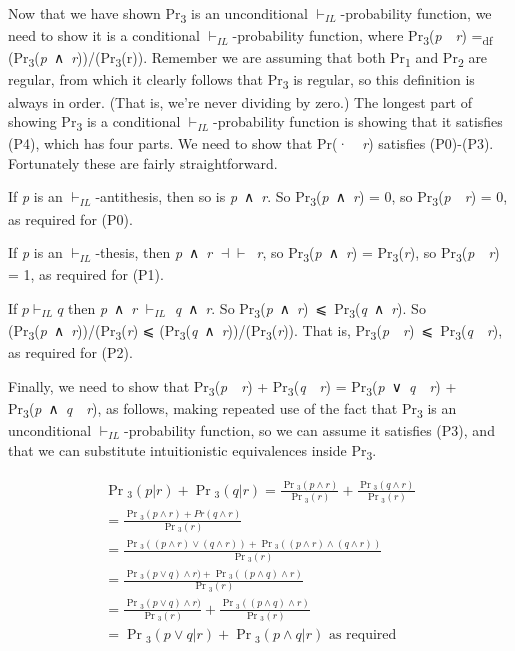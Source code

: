 \documentclass[
  10pt,
  letterpaper,
  DIV=11,
  numbers=noendperiod,
  twoside]{scrartcl}
\begin{document}
Now that we have shown Pr\textsubscript{3} is an unconditional
\(\vdash_{IL}\)-probability function, we need to show it is a
conditional \(\vdash_{IL}\)-probability function, where
Pr\textsubscript{3}(\emph{p}~\textbar~\emph{r}) =\textsubscript{df}
(Pr\textsubscript{3}(\emph{p}~∧~\emph{r}))/(Pr\textsubscript{3}(r)).
Remember we are assuming that both Pr\textsubscript{1} and
Pr\textsubscript{2} are regular, from which it clearly follows that
Pr\textsubscript{3} is regular, so this definition is always in order.
(That is, we're never dividing by zero.) The longest part of showing
Pr\textsubscript{3} is a conditional \(\vdash_{IL}\)-probability
function is showing that it satisfies (P4), which has four parts. We
need to show that Pr(·~\textbar~\emph{r}) satisfies (P0)-(P3).
Fortunately these are fairly straightforward.

If \emph{p} is an \(\vdash_{IL}\)-antithesis, then so is
\emph{p}~∧~\emph{r}. So Pr\textsubscript{3}(\emph{p}~∧~\emph{r}) = 0, so
Pr\textsubscript{3}(\emph{p}~\textbar~\emph{r}) = 0, as required for
(P0).

If \emph{p} is an \(\vdash_{IL}\)-thesis, then \emph{p}~∧~\emph{r}
\(\dashv \vdash\)~\emph{r}, so Pr\textsubscript{3}(\emph{p}~∧~\emph{r})
= Pr\textsubscript{3}(\emph{r}), so
Pr\textsubscript{3}(\emph{p}~\textbar~\emph{r}) = 1, as required for
(P1).

If \(p \vdash_{IL} q\) then \emph{p}~∧~\emph{r} \(\vdash_{IL}\)
\emph{q}~∧~\emph{r}. So
Pr\textsubscript{3}(\emph{p}~∧~\emph{r})~⩽~Pr\textsubscript{3}(\emph{q}~∧~\emph{r}).
So
(Pr\textsubscript{3}(\emph{p}~∧~\emph{r}))/(Pr\textsubscript{3}(\emph{r})
⩽
(Pr\textsubscript{3}(\emph{q}~∧~\emph{r}))/(Pr\textsubscript{3}(\emph{r})).
That is,
Pr\textsubscript{3}(\emph{p}~\textbar~\emph{r})~⩽~Pr\textsubscript{3}(\emph{q}~\textbar~\emph{r}),
as required for (P2).

Finally, we need to show that
Pr\textsubscript{3}(\emph{p}~\textbar~\emph{r}) +
Pr\textsubscript{3}(\emph{q}~\textbar~\emph{r}) =
Pr\textsubscript{3}(\emph{p}~∨~\emph{q}~\textbar~\emph{r}) +
Pr\textsubscript{3}(\emph{p}~∧~\emph{q}~\textbar~\emph{r}), as follows,
making repeated use of the fact that Pr\textsubscript{3} is an
unconditional \(\vdash_{IL}\)-probability function, so we can assume it
satisfies (P3), and that we can substitute intuitionistic equivalences
inside Pr\textsubscript{3}.

\[
\begin{aligned}
\Pr{}_3(p | r) + \Pr{}_3(q | r) = \frac{\Pr{}_3(p ∧ r)}{\Pr{}_3(r)} + \frac{\Pr{}_3(q ∧ r)}{\Pr{}_3(r)} \\
= \frac{\Pr{}_3(p ∧ r) + Pr(q ∧ r)}{\Pr{}_3(r)} \\
= \frac{\Pr{}_3((p ∧ r) ∨ (q ∧ r)) + \Pr{}_3((p ∧ r) ∧ (q ∧ r))}{\Pr{}_3(r)} \\
=\frac{\Pr{}_3(p ∨ q) ∧ r) + \Pr{}_3((p ∧ q) ∧ r)}{\Pr{}_3(r)} \\
=\frac{\Pr{}_3(p ∨ q) ∧ r)}{\Pr{}_3(r)} + \frac{\Pr{}_3((p ∧ q) ∧ r)}{\Pr{}_3(r)} \\
=\Pr{}_3(p ∨ q | r) + \Pr{}_3(p ∧ q | r) \text{ as required}
\end{aligned}
\]
\end{document}
